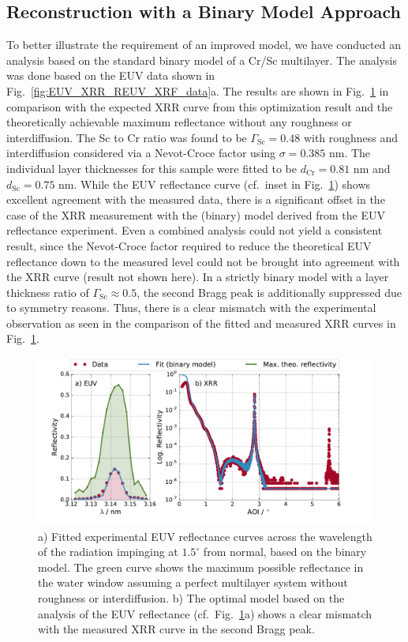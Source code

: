 \subsection{Reconstruction with a Binary Model Approach}
To better illustrate the requirement of an improved model, we have conducted an 
analysis based on the standard binary model of a Cr/Sc multilayer. The analysis 
was done based on the EUV data shown in Fig.~\ref{fig:EUV_XRR_REUV_XRF_data}a. 
The results are shown in Fig.~\ref{fig:EUV_XRR_reflectance} in comparison with 
the expected XRR curve from this optimization result and the theoretically 
achievable maximum reflectance without any roughness or interdiffusion. The Sc 
to Cr ratio was found to be $\Gamma_\text{Sc}=0.48$ with roughness and 
interdiffusion considered via a Nevot-Croce factor using $\sigma=0.385$ nm. The 
individual layer thicknesses for this sample were fitted to be $d_\text{Cr} = 
0.81$ nm and $d_\text{Sc}= 0.75$ nm. While the EUV reflectance curve (cf.~inset 
in Fig.~\ref{fig:EUV_XRR_reflectance}) shows excellent agreement with the 
measured data, there is a significant offset in the case of the XRR measurement 
with the (binary) model derived from the EUV reflectance experiment. Even a 
combined analysis could not yield a consistent result, since the Nevot-Croce 
factor required to reduce the theoretical EUV reflectance down to the measured 
level could not be brought into agreement with the XRR curve (result not shown 
here). In a strictly binary model with a layer thickness ratio of 
$\Gamma_\text{Sc}\approx 0.5$, the second Bragg peak is additionally suppressed 
due to symmetry reasons. Thus, there is a clear mismatch with the experimental 
observation as seen in the comparison of the fitted and measured XRR curves in 
Fig.~\ref{fig:EUV_XRR_reflectance}.
\begin{figure}[htbp]
  \centering
  \includegraphics[width=\textwidth]{images/binary_model_and_theo_refl}
  \caption{a) Fitted experimental EUV reflectance curves across the wavelength 
of the radiation impinging at $1.5^\circ$ from normal, based on the binary 
model. The green curve shows the maximum possible reflectance in the water 
window assuming a perfect multilayer system without roughness or 
interdiffusion. b) The optimal model based on the analysis of the EUV 
reflectance (cf.~Fig.~\ref{fig:EUV_XRR_reflectance}a) shows a clear mismatch 
with the measured XRR curve in the second Bragg peak.
}
  \label{fig:EUV_XRR_reflectance}
\end{figure}

